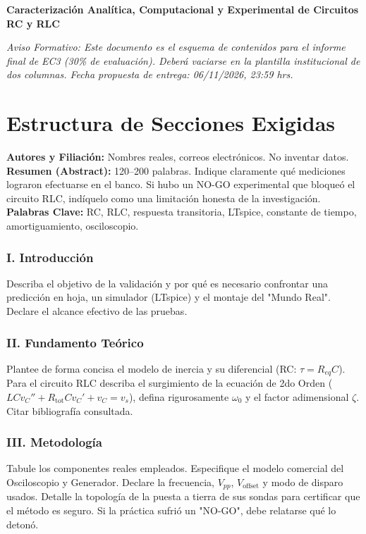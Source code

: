 \documentclass[11pt, a4paper]{article}
\begin{document}
\begin{tcolorbox}[colback=ucbblue!5!white, colframe=ucbblue, title=\textbf{Artefacto A3: Estructura Editorial Compatible IEEE (EC3)}]
    \centering \textbf{Caracterización Analítica, Computacional y Experimental de Circuitos RC y RLC}
\end{tcolorbox}

\noindent\textit{Aviso Formativo: Este documento es el esquema de contenidos para el informe final de EC3 (30\% de evaluación). Deberá vaciarse en la plantilla institucional de dos columnas. Fecha propuesta de entrega: 06/11/2026, 23:59 hrs.}

\section*{Estructura de Secciones Exigidas}

\textbf{Autores y Filiación:} Nombres reales, correos electrónicos. No inventar datos. \\
\textbf{Resumen (Abstract):} 120–200 palabras. Indique claramente qué mediciones lograron efectuarse en el banco. Si hubo un NO-GO experimental que bloqueó el circuito RLC, indíquelo como una limitación honesta de la investigación. \\
\textbf{Palabras Clave:} RC, RLC, respuesta transitoria, LTspice, constante de tiempo, amortiguamiento, osciloscopio.

\subsubsection*{I. Introducción}
Describa el objetivo de la validación y por qué es necesario confrontar una predicción en hoja, un simulador (LTspice) y el montaje del "Mundo Real". Declare el alcance efectivo de las pruebas.

\subsubsection*{II. Fundamento Teórico}
Plantee de forma concisa el modelo de inercia y su diferencial (RC: $\tau = R_{eq}C$). Para el circuito RLC describa el surgimiento de la ecuación de 2do Orden ($LC v_C'' + R_{\text{tot}}C v_C' + v_C = v_s$), defina rigurosamente $\omega_0$ y el factor adimensional $\zeta$. Citar bibliografía consultada.

\subsubsection*{III. Metodología}
Tabule los componentes reales empleados. Especifique el modelo comercial del Osciloscopio y Generador. Declare la frecuencia, $V_{pp}$, $V_{\text{offset}}$ y modo de disparo usados. Detalle la topología de la puesta a tierra de sus sondas para certificar que el método es seguro. Si la práctica sufrió un "NO-GO", debe relatarse qué lo detonó.
\end{document}
